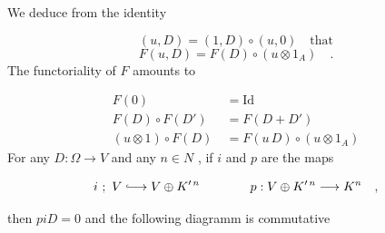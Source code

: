 We deduce from the identity

\begin{equation*}
(u, D) = (1, D) \circ (u, 0) \quad \text{that}
\end{equation*}
\begin{equation*}
F(u, D) = F(D) \circ (u \otimes 1_{A}) \quad .
\end{equation*}
The functoriality of  $F$  amounts to

\begin{equation*}
\begin{aligned}
F(0) &= \mathrm{Id} \\
F(D) \circ F(D') &= F(D + D') \\
(u \otimes 1) \circ F(D) \ &= F(u\,D) \circ (u \otimes 1_{A})
\end{aligned}
\end{equation*}
For any  $D : \Omega \rightarrow V$  and any  $n \in N$  , if  $i$  and  $p$  are the maps

\begin{equation*}
i \ ; \ V \lhook\joinrel\longrightarrow V \oplus K'^{\,n} \qquad\qquad p : V \oplus K'^{\,n} \longrightarrow K^{n} \quad , 
\end{equation*}


 then  $p i D = 0$  and the following diagramm is commutative

